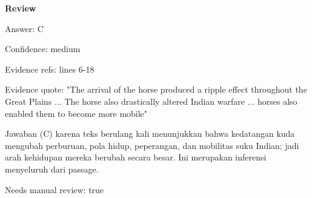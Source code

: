 \documentclass[12pt]{article}
\begin{document}
\par
\begingroup
\setlength{\parskip}{0pt}
\setlength{\parindent}{0pt}
\textbf{Review}\par
Answer: C\par
Confidence: medium\par
Evidence refs: lines 6-18\par
Evidence quote: "The arrival of the horse produced a ripple effect throughout the Great Plains ... The horse also drastically altered Indian warfare ... horses also enabled them to become more mobile"\par
Jawaban (C) karena teks berulang kali menunjukkan bahwa kedatangan kuda mengubah perburuan, pola hidup, peperangan, dan mobilitas suku Indian; jadi arah kehidupan mereka berubah secara besar. Ini merupakan inferensi menyeluruh dari passage.\par
Needs manual review: true\par
\endgroup
\par
\vspace{0.25\baselineskip}
\end{document}
